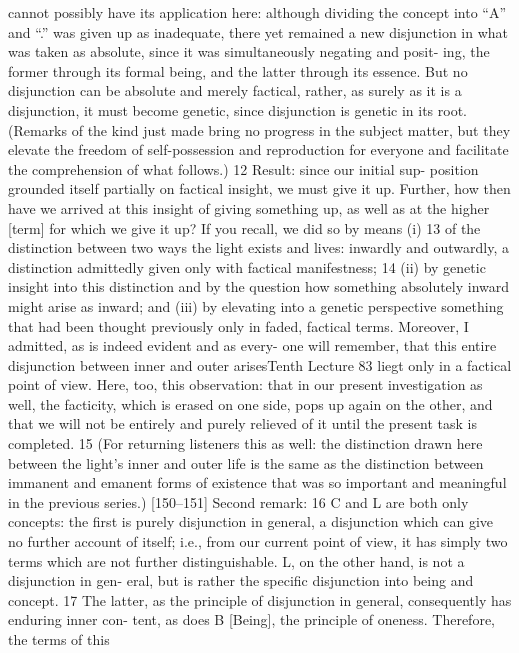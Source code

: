 cannot possibly have its application here: although dividing the concept into
“A” and “.” was given up as inadequate, there yet remained a new disjunction
in what was taken as absolute, since it was simultaneously negating and posit-
ing, the former through its formal being, and the latter through its essence.
But no disjunction can be absolute and merely factical, rather, as surely as it is
a disjunction, it must become genetic, since disjunction is genetic in its root.
(Remarks of the kind just made bring no progress in the subject matter, but
they elevate the freedom of self-possession and reproduction for everyone and
facilitate the comprehension of what follows.) 12 Result: since our initial sup-
position grounded itself partially on factical insight, we must give it up.
Further, how then have we arrived at this insight of giving something
up, as well as at the higher [term] for which we give it up? If you recall, we
did so by means (i) 13 of the distinction between two ways the light exists and
lives: inwardly and outwardly, a distinction admittedly given only with factical
manifestness; 14 (ii) by genetic insight into this distinction and by the question
how something absolutely inward might arise as inward; and (iii) by elevating
into a genetic perspective something that had been thought previously only in
faded, factical terms. Moreover, I admitted, as is indeed evident and as every-
one will remember, that this entire disjunction between inner and outer arisesTenth Lecture
83
{liegt} only in a factical point of view. Here, too, this observation: that in our
present investigation as well, the facticity, which is erased on one side, pops up
again on the other, and that we will not be entirely and purely relieved of it
until the present task is completed. 15 (For returning listeners this as well: the
distinction drawn here between the light’s inner and outer life is the same as
the distinction between immanent and emanent forms of existence that was so
important and meaningful in the previous series.)
[150–151] Second remark: 16 C and L are both only concepts: the first is
purely disjunction in general, a disjunction which can give no further account
of itself; i.e., from our current point of view, it has simply two terms which are
not further distinguishable. L, on the other hand, is not a disjunction in gen-
eral, but is rather the specific disjunction into being and concept. 17 The latter,
as the principle of disjunction in general, consequently has enduring inner con-
tent, as does B [Being], the principle of oneness. Therefore, the terms of this
